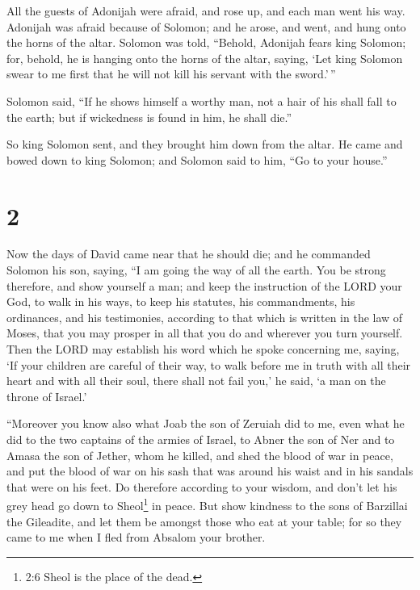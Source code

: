  All the guests of Adonijah were afraid, and rose up, and
each man went his way.  Adonijah was afraid because of
Solomon; and he arose, and went, and hung onto the horns of the altar.
 Solomon was told, ``Behold, Adonijah fears king Solomon;
for, behold, he is hanging onto the horns of the altar, saying, `Let
king Solomon swear to me first that he will not kill his servant with
the sword.'\,''

 Solomon said, ``If he shows himself a worthy man, not a
hair of his shall fall to the earth; but if wickedness is found in him,
he shall die.''

 So king Solomon sent, and they brought him down from the
altar. He came and bowed down to king Solomon; and Solomon said to him,
``Go to your house.''

\hypertarget{section-1}{%
\section{2}\label{section-1}}

 Now the days of David came near that he should die; and he
commanded Solomon his son, saying,  ``I am going the way of
all the earth. You be strong therefore, and show yourself a man;
 and keep the instruction of the LORD your God, to walk in
his ways, to keep his statutes, his commandments, his ordinances, and
his testimonies, according to that which is written in the law of Moses,
that you may prosper in all that you do and wherever you turn yourself.
 Then the LORD may establish his word which he spoke
concerning me, saying, `If your children are careful of their way, to
walk before me in truth with all their heart and with all their soul,
there shall not fail you,' he said, `a man on the throne of Israel.'

 ``Moreover you know also what Joab the son of Zeruiah did
to me, even what he did to the two captains of the armies of Israel, to
Abner the son of Ner and to Amasa the son of Jether, whom he killed, and
shed the blood of war in peace, and put the blood of war on his sash
that was around his waist and in his sandals that were on his feet.
 Do therefore according to your wisdom, and don't let his
grey head go down to Sheol\footnote{2:6 Sheol is the place of the dead.}
in peace.  But show kindness to the sons of Barzillai the
Gileadite, and let them be amongst those who eat at your table; for so
they came to me when I fled from Absalom your brother.


